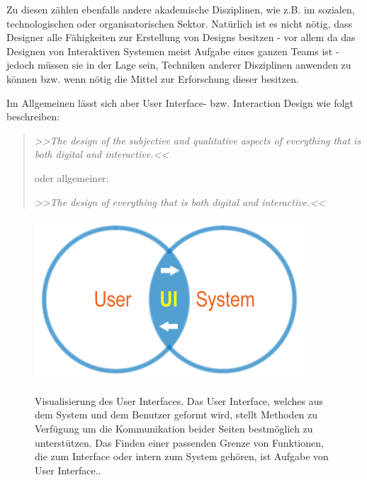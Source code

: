\medskip Zu diesen zählen ebenfalls andere akademische Disziplinen, wie z.B. im sozialen, technologischen oder organisatorischen Sektor. Natürlich ist es nicht nötig, dass Designer alle Fähigkeiten zur Erstellung von Designs besitzen - vor allem da das Designen von Interaktiven Systemen meist Aufgabe eines ganzen Teams ist - jedoch müssen sie in der Lage sein, Techniken anderer Disziplinen	anwenden	zu können bzw. wenn nötig die Mittel zur Erforschung dieser besitzen. \citep{Benyon:2005}

\medskip Im Allgemeinen lässt sich aber User Interface- bzw. Interaction Design wie folgt beschreiben:

\begin{quote}
	\textsl{>>The design of the subjective and qualitative aspects of everything that is both digital and interactive.<<}
	
	\smallskip oder allgemeiner: 
	\smallskip
	
	\textsl{>>The design of everything that is both digital and interactive.<<}
\begin{flushright}\citep{Moggridge:2007}\end{flushright}
\end{quote}

\begin{figure}
	\begin{center}
        {\includegraphics[width=.7\linewidth]{gfx/sagmeisterUI}}
	\end{center}
		\caption[Visualisierung des User Interfaces \newline \citep{Sagmeister:2008}]{Visualisierung des User Interfaces. Das User Interface, welches aus dem System und dem Benutzer geformt wird, stellt Methoden zu Verfügung um die Kommunikation beider Seiten bestmöglich zu unterstützen. Das Finden einer passenden Grenze von Funktionen, die zum Interface oder intern zum System gehören, ist Aufgabe von User Interface..}\label{fig:sagmeisterUI}
\end{figure}

